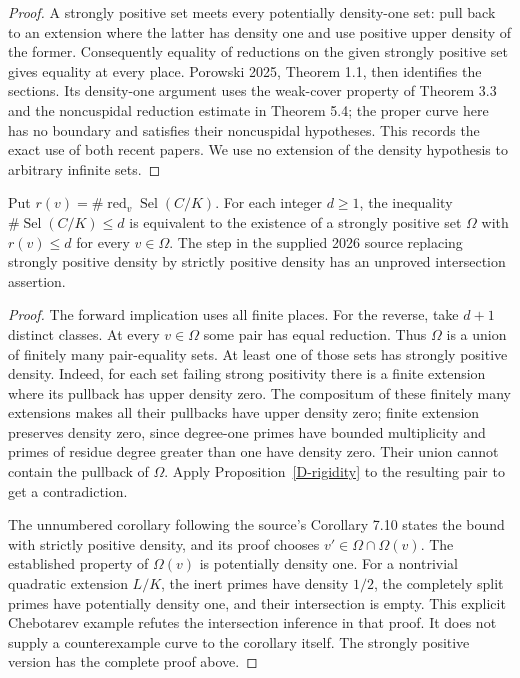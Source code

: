 \begin{proof}
A strongly positive set meets every potentially
density-one set: pull back to an extension
where the latter has density one and use
positive upper density of the former.
Consequently equality of reductions on the
given strongly positive set gives equality
at every place. Porowski 2025, Theorem 1.1,
then identifies the sections. Its density-one
argument uses the weak-cover property of
Theorem 3.3 and the noncuspidal reduction
estimate in Theorem 5.4; the proper curve
here has no boundary and satisfies their
noncuspidal hypotheses. This records the
exact use of both recent papers. We use no
extension of the density hypothesis to
arbitrary infinite sets.
\end{proof}

\begin{proposition}
\label{D-uniform}
Put $r(v)=\#\operatorname{red}_v\operatorname{Sel}(C/K)$.
For each integer $d\geq1$, the inequality
$\#\operatorname{Sel}(C/K)\leq d$ is equivalent
to the existence of a strongly positive set
$\Omega$ with $r(v)\leq d$ for every $v\in\Omega$.
The step in the supplied 2026 source replacing
strongly positive density by strictly positive
density has an unproved intersection assertion.
\end{proposition}
\begin{proof}
The forward implication uses all finite places.
For the reverse, take $d+1$ distinct classes.
At every $v\in\Omega$ some pair has equal
reduction. Thus $\Omega$ is a union of
finitely many pair-equality sets. At least
one of those sets has strongly positive
density. Indeed, for each set failing
strong positivity there is a finite extension
where its pullback has upper density zero.
The compositum of these finitely many
extensions makes all their pullbacks have
upper density zero; finite extension preserves
density zero, since degree-one primes have
bounded multiplicity and primes of residue
degree greater than one have density zero.
Their union cannot contain the pullback
of $\Omega$. Apply Proposition~\ref{D-rigidity}
to the resulting pair to get a contradiction.

The unnumbered corollary following the source's
Corollary 7.10 states the bound with strictly
positive density, and its proof chooses
$v'\in\Omega\cap\Omega(v)$. The established
property of $\Omega(v)$ is potentially density
one. For a nontrivial quadratic extension
$L/K$, the inert primes have density $1/2$,
the completely split primes have potentially
density one, and their intersection is empty.
This explicit Chebotarev example refutes the
intersection inference in that proof.
It does not supply a counterexample curve
to the corollary itself. The strongly positive
version has the complete proof above.
\end{proof}

